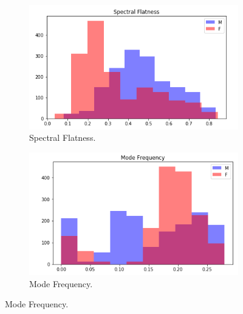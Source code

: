 \documentclass[12pt]{article}
\begin{document}
\begin{figure}[H]
	\begin{subfigure}{0.49\linewidth}
		\centering
		\includegraphics[width=\linewidth]{images/hist_sf.png}
		\caption{Spectral Flatness.}
		\label{fig:hist_sf}
	\end{subfigure}
	\begin{subfigure}{0.49\linewidth}
		\centering
		\includegraphics[width=\linewidth]{images/hist_mf.png}
		\caption{Mode Frequency.}
		\label{fig:hist_mf}
	\end{subfigure}
	\hfill
	

\end{figure}
\end{document}
